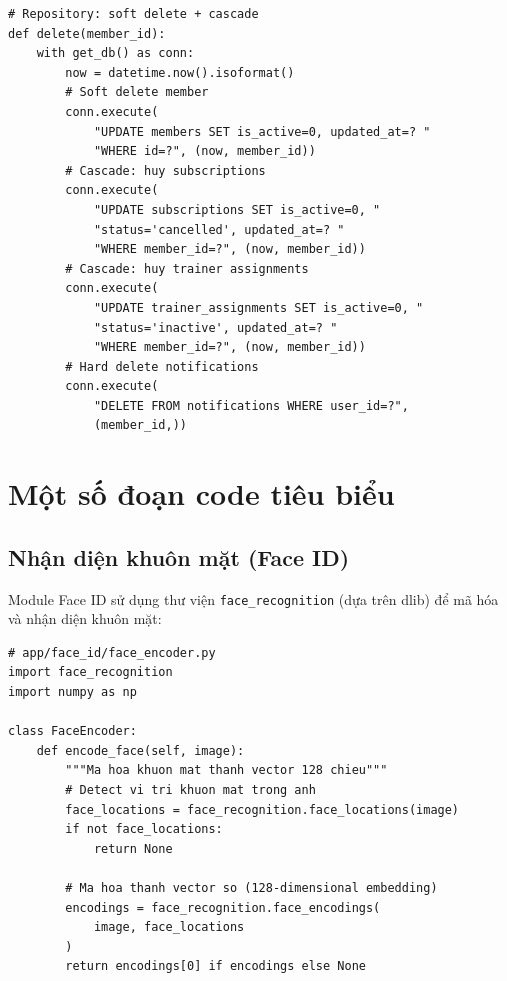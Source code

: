 \documentclass[12pt,a4paper]{article}
\begin{document}
\begin{lstlisting}[style=pythonstyle, caption={Xóa mềm hội viên (cascade)}]
# Repository: soft delete + cascade
def delete(member_id):
    with get_db() as conn:
        now = datetime.now().isoformat()
        # Soft delete member
        conn.execute(
            "UPDATE members SET is_active=0, updated_at=? "
            "WHERE id=?", (now, member_id))
        # Cascade: huy subscriptions
        conn.execute(
            "UPDATE subscriptions SET is_active=0, "
            "status='cancelled', updated_at=? "
            "WHERE member_id=?", (now, member_id))
        # Cascade: huy trainer assignments
        conn.execute(
            "UPDATE trainer_assignments SET is_active=0, "
            "status='inactive', updated_at=? "
            "WHERE member_id=?", (now, member_id))
        # Hard delete notifications
        conn.execute(
            "DELETE FROM notifications WHERE user_id=?",
            (member_id,))
\end{lstlisting}

\section{Một số đoạn code tiêu biểu}

\subsection{Nhận diện khuôn mặt (Face ID)}

Module Face ID sử dụng thư viện \texttt{face\_recognition} (dựa trên dlib) để mã hóa và nhận diện khuôn mặt:

\begin{lstlisting}[style=pythonstyle, caption={Mã hóa khuôn mặt}]
# app/face_id/face_encoder.py
import face_recognition
import numpy as np

class FaceEncoder:
    def encode_face(self, image):
        """Ma hoa khuon mat thanh vector 128 chieu"""
        # Detect vi tri khuon mat trong anh
        face_locations = face_recognition.face_locations(image)
        if not face_locations:
            return None

        # Ma hoa thanh vector so (128-dimensional embedding)
        encodings = face_recognition.face_encodings(
            image, face_locations
        )
        return encodings[0] if encodings else None
\end{lstlisting}
\end{document}
